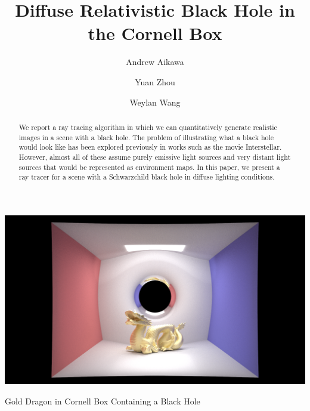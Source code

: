 \documentclass[sigconf]{acmart}
\begin{document}
%
\title{Diffuse Relativistic Black Hole in the Cornell Box}

%
\author{Andrew Aikawa}

\author{Yuan Zhou}

\author{Weylan Wang}

\begin{abstract}
We report a ray tracing algorithm in which we can quantitatively generate realistic images in a scene with a black hole.  The problem of illustrating what a black hole would look like has been explored previously in works such as the movie Interstellar\cite{james_tunzelmann_franklin_thorne_2015}. However, almost all of these assume purely emissive light sources and very distant light sources that would be represented as environment maps.  In this paper, we present a ray tracer for a scene with a Schwarzchild black hole in diffuse lighting conditions.
\end{abstract}


%

%
\begin{teaserfigure}
  \includegraphics[width=\textwidth]{dragon.png}
  \caption{Gold Dragon in Cornell Box Containing a Black Hole}
  \label{fig:teaser}
\end{teaserfigure}
\end{document}
